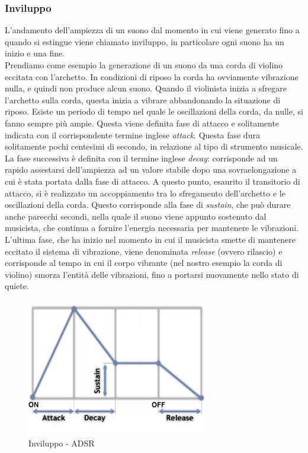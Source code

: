 \documentclass[12pt]{report}
\begin{document}
		\subsubsection{Inviluppo}
		\label{cap2sec1_1_1}
			L'andamento dell'ampiezza di un suono dal momento in cui viene generato fino a quando si estingue viene chiamato inviluppo, in particolare ogni suono ha un inizio e una fine.\\
Prendiamo come esempio la generazione di un suono da una corda di violino eccitata con l'archetto. In condizioni di riposo la corda ha ovviamente vibrazione nulla, e quindi non produce alcun suono. Quando il violinista inizia a sfregare l'archetto sulla corda, questa inizia a vibrare abbandonando la situazione di riposo. Esiste un periodo di tempo nel quale le oscillazioni della corda, da nulle, si fanno sempre più ampie. Questa viene definita fase di attacco e solitamente indicata con il corrispondente termine inglese {\itshape attack}. Questa fase dura solitamente pochi centesimi di secondo, in relazione al tipo di strumento musicale. La fase successiva è definita con il termine inglese {\itshape decay}: corrisponde ad un rapido assestarsi dell'ampiezza ad un valore stabile dopo una sovraelongazione a cui è stata portata dalla fase di attacco. A questo punto, esaurito il transitorio di attacco, si è realizzato un accoppiamento tra lo sfregamento dell'archetto e le oscillazioni della corda. Questo corrisponde alla fase di {\itshape sustain}, che può durare anche parecchi secondi, nella quale il suono viene appunto sostenuto dal musicista, che continua a fornire l'energia necessaria per mantenere le vibrazioni. L'ultima fase, che ha inizio nel momento in cui il musicista smette di mantenere eccitato il sistema di vibrazione, viene denominata {\itshape release} (ovvero rilascio) e corrisponde al tempo in cui il corpo vibrante (nel nostro esempio la corda di violino) smorza l’entità delle vibrazioni, fino a portarsi nuovamente nello stato di quiete.

\begin{figure}[htbp]
\centerline{\includegraphics[height=60mm]{img/adsr}}
\caption{Inviluppo - ADSR}
\label{fig:adsr}
\end{figure}
		
\end{document}
